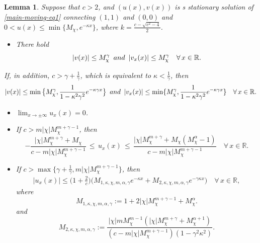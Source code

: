 \documentclass[10pt,a4paper]{amsart}
\newtheorem{lemma}{Lemma}
\newcommand\RR{\ensuremath{\mathbb{R}}}
\begin{document}
\begin{lemma}
\label{estimate-lm1}
Suppose that $c>2$, and  $(u(x),v(x))$ is  s stationary  solution of \eqref{main-moving-eq1}  connecting $(1,1)$ and $(0,0)$  and $0<u(x)\le \min\{M_\chi, e^{-\kappa x}\}$, where $k=\frac{c-\sqrt{c^2-4}}{2}$.

\begin{itemize}
\item[(1)] There hold
\begin{equation}
\label{estimate-eq0}
|v(x)|\le  M_\chi^\gamma 
 \,\,\, {\rm and}\,\,\,
|v_x(x)|\le  M_\chi^\gamma  \quad \forall\, x\in\RR.
\end{equation}
\end{itemize}

If, in addition,   {$c>\gamma+\frac{1}{\gamma}$,}  which is equivalent to $\kappa<\frac{1}{\gamma}$, then
\begin{equation}
\label{estimate-eq1}
|v(x)|\le  \min\big\{M_\chi^\gamma , \frac{1}{1-\kappa^2 \gamma^2}e^{-\kappa\gamma  x}\big \}
 \,\,\, {\rm and}\,\,\,
|v_x(x)|\le  \min\{M_{\chi}^\gamma ,  \frac{1}{1-\kappa^2 \gamma^2}  e^{-\kappa\gamma  x}\}  \quad \forall\, x\in\RR.
\end{equation}

\begin{itemize}
\item[(2)] $\lim_{x\to\pm \infty} u_x(x)=0$.

\item[(3)] If {$c> m|\chi| M^{m+\gamma-1}_\chi$,}  then  
\begin{equation}
\label{estimate-eq2}
 -\frac{|\chi| M_{\chi}^{m+\gamma}+M_{\chi}}{c-m|\chi| M^{m+\gamma-1} _{\chi} } \,   \le\,  u_x(x)\,  \le  \,  \frac{|\chi| M_\chi^{m+\gamma} +M_\chi(M_\chi^\alpha -1)}{c- m |\chi| M^{m+\gamma-1}_\chi }  \quad \forall\, x\in\RR.
\end{equation}


\item[(4)]  If {$c>\max\big\{\gamma+\frac{1}{\gamma}, m|\chi| M^{m+\gamma-1}_\chi\big\}$,}  then 
\begin{align}
\label{estimate-eq3}
|u_x(x)|\le  \Big(1+\frac{2}{c}\Big) \Big(M_{1,\kappa,\chi,m,\alpha,\gamma}  e^{-\kappa x}+M_{2,\kappa,\chi,m,\alpha,\gamma}e^{-\gamma\kappa x}\Big)\quad \forall\, x\in\RR,
\end{align}
where
$$
M_{1,\kappa,\chi,m,\alpha,\gamma}:= 1+2 |\chi| M^{m+\gamma-1}_\chi+M_\chi^{\alpha}.
$$
and
$$
M_{2, \kappa,\chi,m,\alpha,\gamma}:=\frac{|\chi| m M_{\chi}^{m-1} (|\chi| M_{\chi}^{m+\gamma}+M_\chi^{\alpha+1}) }{(c- m|\chi| M^{m+\gamma-1}_{\chi})(1-\gamma^2\kappa^2)}.
$$
\end{itemize}
\end{lemma}
\end{document}
